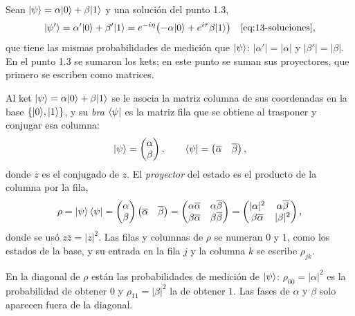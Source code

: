 Sean $\lvert \psi\rangle=\alpha\lvert 0\rangle+\beta\lvert 1\rangle$ y una solución del punto 1.3,
\[
  \lvert \psi'\rangle=\alpha'\lvert 0\rangle+\beta'\lvert 1\rangle=e^{-i\eta}\bigl(-\alpha\lvert 0\rangle+e^{i\tau}\beta\lvert 1\rangle\bigr)
  \quad\eqref{eq:13-soluciones},
\]
que tiene las mismas probabilidades de medición que $\lvert \psi\rangle$: $|\alpha'|=|\alpha|$ y
$|\beta'|=|\beta|$. En el punto 1.3 se sumaron los kets; en este punto se suman sus proyectores,
que primero se escriben como matrices.

\begin{definicionT}
Al ket $\lvert \psi\rangle=\alpha\lvert 0\rangle+\beta\lvert 1\rangle$ se le asocia la matriz columna de sus coordenadas en la
base $\{\lvert 0\rangle,\lvert 1\rangle\}$, y su \emph{bra} $\bra\psi$ es la matriz fila que se obtiene al trasponer
y conjugar esa columna:
\[
  \lvert \psi\rangle=\begin{pmatrix}\alpha\\ \beta\end{pmatrix},\qquad
  \bra\psi=\begin{pmatrix}\overline\alpha & \overline\beta\end{pmatrix},
\]
donde $\overline z$ es el conjugado de $z$. El \emph{proyector} del estado es el producto de la
columna por la fila,
\begin{equation}\label{eq:14-proyector}
  \rho=\lvert \psi\rangle\bra\psi
  =\begin{pmatrix}\alpha\\ \beta\end{pmatrix}
   \begin{pmatrix}\overline\alpha & \overline\beta\end{pmatrix}
  =\begin{pmatrix}\alpha\overline\alpha & \alpha\overline\beta\\
                  \beta\overline\alpha & \beta\overline\beta\end{pmatrix}
  =\begin{pmatrix}|\alpha|^2 & \alpha\overline\beta\\
                  \beta\overline\alpha & |\beta|^2\end{pmatrix},
\end{equation}
donde se usó $z\overline z=|z|^2$. Las filas y columnas de $\rho$ se numeran $0$ y $1$, como los
estados de la base, y su entrada en la fila $j$ y la columna $k$ se escribe $\rho_{jk}$.
\end{definicionT}

En la diagonal de $\rho$ están las probabilidades de medición de $\lvert \psi\rangle$: $\rho_{00}=|\alpha|^2$
es la probabilidad de obtener $0$ y $\rho_{11}=|\beta|^2$ la de obtener $1$. Las fases de $\alpha$
y $\beta$ solo aparecen fuera de la diagonal.

